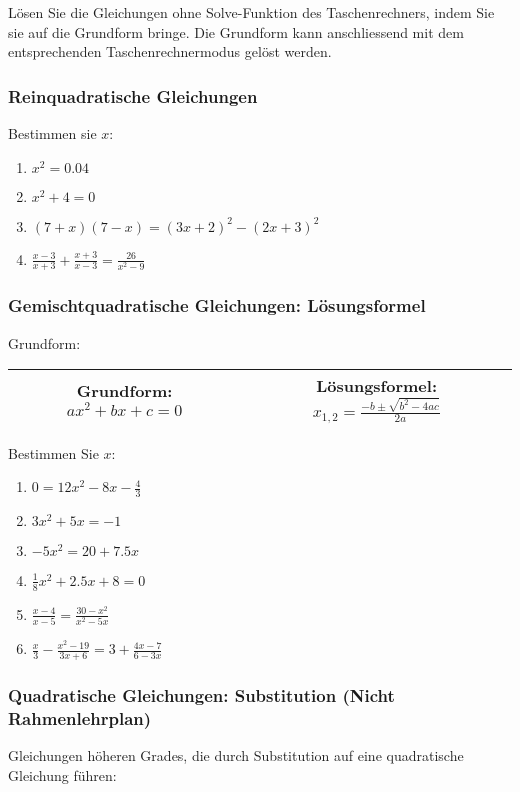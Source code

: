   Lösen Sie die Gleichungen ohne Solve-Funktion des Taschenrechners,
  indem Sie sie auf die Grundform bringe. Die Grundform kann
  anschliessend mit dem entsprechenden Taschenrechnermodus gelöst
  werden.

  \subsubsection{Reinquadratische Gleichungen}
  Bestimmen sie $x$:
  \begin{multicols}{2}
  \begin{enumerate}
  \item $x^2 = 0.04$
  \item $x^2+4=0$
  \item $(7+x)(7-x)=(3x+2)^2-(2x+3)^2$
    \item $\frac{x-3}{x+3} + \frac{x+3}{x-3} = \frac{26}{x^2-9}$
  \end{enumerate}
  \end{multicols}

  \subsubsection{Gemischtquadratische Gleichungen: Lösungsformel}
  Grundform:

  \begin{tabular}{|c|c|}%
    \hline%
Grundform: $ax^2 + bx +c = 0$ & Lösungsformel: $x_{1,2} = \frac{-b \pm \sqrt{b^2 - 4ac}}{2a}$\\%
    \hline%
    \end{tabular}%

  Bestimmen Sie $x$:
  \begin{multicols}{3}
  \begin{enumerate}
  \item $0 = 12x^2 - 8x - \frac{4}{3}$
  \item $3x^2 + 5x = -1$
  \item $-5x^2 = 20 + 7.5x$
  \item $\frac{1}{8}x^2 + 2.5x + 8 = 0$
  \item $\frac{x-4}{x-5} = \frac{30-x^2}{x^2-5x}$
    \item $\frac{x}{3} - \frac{x^2-19}{3x+6} = 3 + \frac{4x-7}{6-3x}$
    \end{enumerate}
    \end{multicols}




  \subsubsection{Quadratische Gleichungen: Substitution (Nicht Rahmenlehrplan)}
  Gleichungen höheren Grades, die durch Substitution auf eine
  quadratische Gleichung führen:

